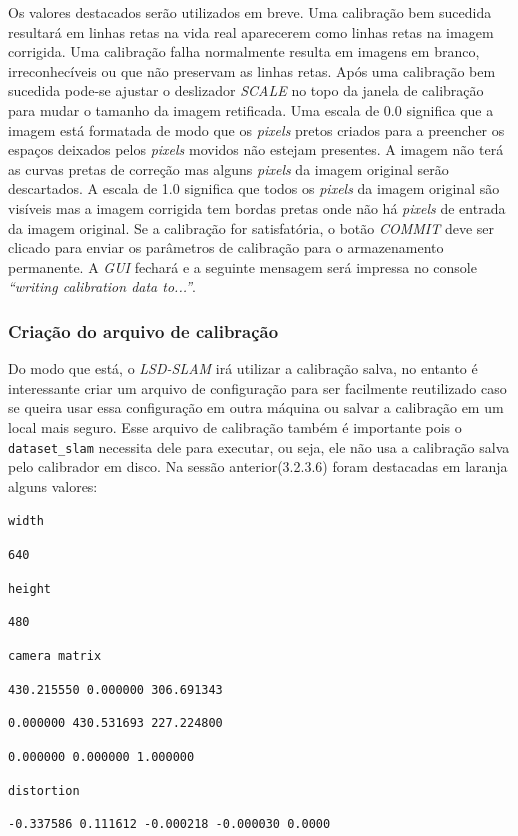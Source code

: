 Os valores destacados serão utilizados em breve. Uma calibração bem sucedida resultará em linhas retas na vida real aparecerem como linhas retas na imagem corrigida. Uma calibração falha normalmente resulta em imagens em branco, irreconhecíveis ou que não preservam as linhas retas.
Após uma calibração bem sucedida pode-se ajustar o deslizador \textit{SCALE} no topo da janela de calibração para mudar o tamanho da imagem retificada. Uma escala de 0.0 significa que a imagem está formatada de modo que os \textit{pixels} pretos criados para a preencher os espaços deixados pelos \textit{pixels} movidos não estejam presentes. A imagem não terá as curvas pretas de correção mas alguns \textit{pixels} da imagem original serão descartados. A escala de 1.0 significa que todos os \textit{pixels} da imagem original são visíveis mas a imagem corrigida tem bordas pretas onde não há \textit{pixels} de entrada da imagem original.
Se a calibração for satisfatória, o botão \textit{COMMIT} deve ser clicado para enviar os parâmetros de calibração para o armazenamento permanente. A \textit{GUI} fechará e a seguinte mensagem será impressa no console \textit{“writing calibration data to...”}.

\subsubsection{Criação do arquivo de calibração}

Do modo que está, o \textit{LSD-SLAM} irá utilizar a calibração salva, no entanto é interessante criar um arquivo de configuração para ser facilmente reutilizado caso se queira usar essa configuração em outra máquina ou salvar a calibração em um local mais seguro. Esse arquivo de calibração também é importante pois o \texttt{dataset\_slam} necessita dele para executar, ou seja, ele não usa a calibração salva pelo calibrador em disco. Na sessão anterior(3.2.3.6) foram destacadas em laranja alguns valores:

{\setlength{\parindent}{0cm}
\texttt{width}

\texttt{640}


\texttt{height}

\texttt{480}


\texttt{camera matrix}

\texttt{430.215550 0.000000 306.691343}

\texttt{0.000000 430.531693 227.224800}

\texttt{0.000000 0.000000 1.000000}


\texttt{distortion}

\texttt{-0.337586 0.111612 -0.000218 -0.000030 0.0000}}



